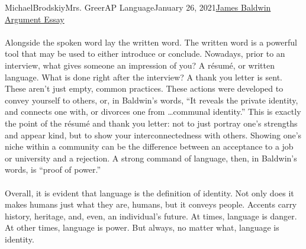 \documentclass[12pt,letterpaper]{article}
\begin{document}
\begin{mla}{Michael}{Brodskiy}{Mrs. Greer}{AP Language}{January 26, 2021}{\underline{James Baldwin Argument Essay}}
    \paragraph{} \quad Alongside the spoken word lay the written word. The written word is a powerful tool that may be used to either introduce or conclude. Nowadays, prior to an interview, what gives someone an impression of you? A r\'esum\'e, or written language. What is done right after the interview? A thank you letter is sent. These aren't just empty, common practices. These actions were developed to convey yourself to others, or, in Baldwin's words, ``It reveals the private identity, and connects one with, or divorces one from \ldots communal identity.'' This is exactly the point of the r\'esum\'e and thank you letter: not to just portray one's strengths and appear kind, but to show your interconnectedness with others. Showing one's niche within a community can be the difference between an acceptance to a job or university and a rejection. A strong command of language, then, in Baldwin's words, is ``proof of power.''\\

    \paragraph{} \quad Overall, it is evident that language is the definition of identity. Not only does it makes humans just what they are, humans, but it conveys people. Accents carry history, heritage, and, even, an individual's future. At times, language is danger. At other times, language is power. But always, no matter what, language is identity.\\

\end{mla}
\end{document}
